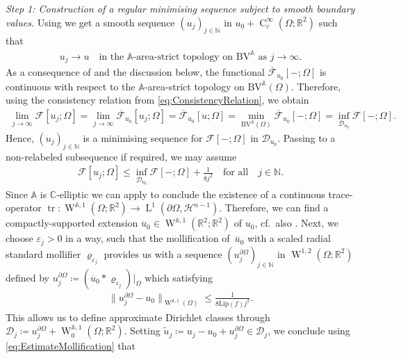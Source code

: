 \documentclass[a4paper,10pt,reqno,oneside]{amsart}
\numberwithin{equation}{section}
\newcommand{\R}{\mathbb R}
\newcommand{\C}{\mathbb C}
\newcommand{\N}{\mathbb N}
\newcommand{\Aop}{\mathbb{A}}
\newcommand{\Hd}{\mathscr{H}}
\newcommand{\lebe}{\operatorname{L}}
\newcommand{\sobo}{\operatorname{W}}
\newcommand{\hold}{\operatorname{C}}
\newcommand{\BV}{\mathrm{BV}}
\DeclareMathOperator{\tr}{tr}
\newcommand{\eps}{\varepsilon}
\newcommand{\del}{\partial}
\newcommand{\F}{\mathscr{F}}
\begin{document}
\emph{Step 1: Construction of a regular minimising sequence subject to smooth boundary values.} Using \cite[Proposition 4.24]{BDG} we get a smooth sequence $(u_j)_{j\in\N}$ in $u_0 + \hold^\infty_c(\Omega;\R^2)$  such that 
\begin{align}\label{eq:AreaStrictConvergence}
	u_j \to u\quad\mbox{in the $\Aop$-area-strict topology on $\BV^{\Aop}$ as } j\to\infty.
\end{align}
As a consequence of  and the discussion below, the functional $\overline{\F}_{u_0}[-;\Omega]$ is continuous with respect to the $\Aop$-area-strict topology on $\BV^{\Aop}(\Omega)$. Therefore, using the consistency relation from \eqref{eq:ConsistencyRelation}, we obtain 
\begin{align*}
	\lim_{j\to\infty} \F[u_j; \Omega] = \lim_{j\to\infty} \overline{\F}_{u_0}[u_j;\Omega] = \overline{\F}_{u_0}[u; \Omega] = \min_{\BV^{\Aop}(\Omega)} \overline{\F}_{u_0}[-;\Omega] = \inf_{\mathscr{D}_{u_0}}\F[-;\Omega]. 
\end{align*}
Hence, $(u_j)_{j\in\N}$ is a minimising sequence for $\F[-;\Omega]$ in $\mathscr{D}_{u_0}$. Passing to a non-relabeled subsequence if required, we may assume 
\begin{align}\label{eq:minimisingSequence}
	\F[u_j;\Omega] \leq \inf_{\mathscr{D}_{u_0}} \F[-;\Omega] + \frac{1}{8j^2}\quad\mbox{for all}\quad j\in\N.
\end{align}
Since $\Aop$ is $\C$-elliptic we can apply \cite[Theorem 4.17]{BDG} to conclude the existence of a continuous trace-operator $\tr\colon\sobo^{\Aop,1}(\Omega;\R^2) \to \lebe^1(\del\Omega, \Hd^{n-1})$. Therefore, we can find a compactly-supported extension $\overline{u}_0\in\sobo^{\Aop,1}(\R^2;\R^2)$ of $u_0$, cf.~also \cite[Corollary 4.21]{BDG}.
Next, we choose $\eps_j>0$ in a way, such that the mollification of \,$\overline{u}_0$ with a scaled radial standard mollifier $\varrho_{\eps_j}$ provides us with a sequence $(u_j^{\del\Omega})_{j\in\N}$ in $\sobo^{1,2}(\Omega;\R^2)$ defined by $u_j^{\del\Omega}\coloneqq (\overline{u}_0\ast \varrho_{\eps_j})\vert_{\Omega}$ which satisfying
\begin{align}\label{eq:EstimateMollification}
	\|u_j^{\del\Omega} - u_0\|_{\sobo^{\Aop,1}(\Omega)} \leq \frac{1}{8 \mathrm{Lip}(f) j^2}. 
\end{align}
This allows us to define approximate Dirichlet classes through $\mathscr{D}_j\coloneqq u_j^{\del\Omega} + \sobo^{\Aop,1}_0(\Omega;\R^2)$. Setting $\tilde{u}_j \coloneqq u_j -u_0 + u_j^{\del\Omega}\in\mathscr{D}_j$, we conclude using \eqref{eq:EstimateMollification} that 
\end{document}
